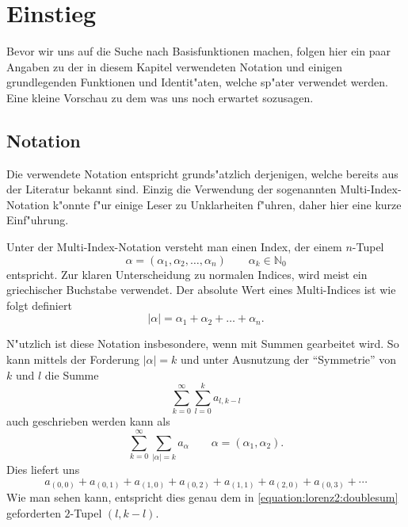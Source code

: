 \section{Einstieg\label{section:lorenz2:einstieg}}

Bevor wir uns auf die Suche nach Basisfunktionen machen, folgen hier ein paar 
Angaben zu der in diesem Kapitel verwendeten Notation und einigen 
grundlegenden Funktionen und Identit"aten, welche sp"ater verwendet werden. 
Eine kleine Vorschau zu dem was uns noch erwartet sozusagen.

\subsection{Notation}
Die verwendete Notation entspricht grunds"atzlich derjenigen, welche 
bereits aus der Literatur bekannt sind. Einzig die Verwendung der 
sogenannten Multi-Index-Notation k"onnte f"ur einige Leser zu Unklarheiten 
f"uhren, daher hier eine kurze Einf"uhrung.

Unter der Multi-Index-Notation versteht man einen Index, der einem 
$n$-Tupel
\begin{equation*}
	\alpha = (\alpha_1, \alpha_2, \dotsc, \alpha_n) \qquad \alpha_k \in 
	\mathbb{N}_{0}
\end{equation*}
entspricht. Zur klaren Unterscheidung zu normalen Indices, wird meist ein 
griechischer Buchstabe verwendet. Der absolute Wert eines Multi-Indices ist wie 
folgt definiert
\begin{equation*}
	|\alpha| = \alpha_1 + \alpha_2 + \dots + \alpha_n.
\end{equation*}
 
N"utzlich ist diese Notation insbesondere, wenn mit Summen gearbeitet wird. So 
kann mittels der Forderung $|\alpha| = k$ und unter Ausnutzung der 
``Symmetrie'' von $k$ und $l$ die Summe
\begin{equation}
	\sum_{k = 0}^{\infty}\sum_{l = 0}^{k}a_{l, k - l}
	\label{equation:lorenz2:doublesum}
\end{equation}
auch geschrieben werden kann als
\begin{equation*}
	\sum_{k = 0}^{\infty}\sum_{|\alpha| = k}a_{\alpha}
	\qquad \alpha = (\alpha_1, \alpha_2).
\end{equation*}
Dies liefert uns
\begin{equation*}
	a_{(0,0)} +
	a_{(0,1)} + a_{(1,0)} +
	a_{(0,2)} + a_{(1,1)} + a_{(2,0)} +
	a_{(0,3)} + \dotsb
\end{equation*}
Wie man sehen kann, entspricht dies genau dem in 
\cref{equation:lorenz2:doublesum} geforderten $2$-Tupel $(l, k - l)$.

